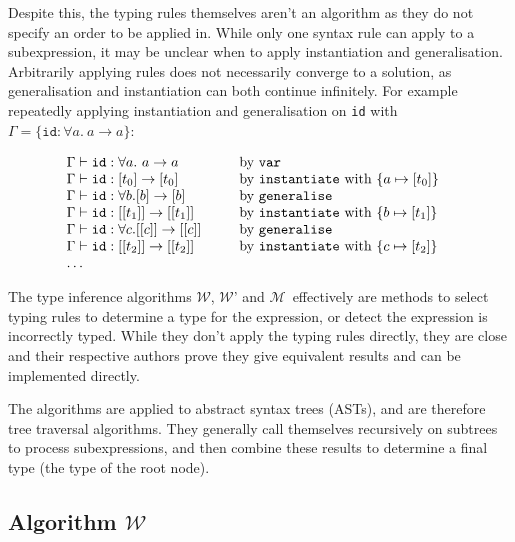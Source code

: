\documentclass[a4paper,fleqn,oneside,12pt]{report}
\newcommand{\W}{$\mathcal{W}$}
\newcommand{\M}{$\mathcal{M}$}
\begin{document}
Despite this, the typing rules themselves aren't an algorithm as they do not specify an order to be applied in. While only one syntax rule can apply to a subexpression, it may be unclear when to apply instantiation and generalisation. Arbitrarily applying rules does not necessarily converge to a solution, as generalisation and instantiation can both continue infinitely. For example repeatedly applying instantiation and generalisation on \texttt{id} with $\Gamma = \{ \mathtt{id} : \forall a.\ a \rightarrow a \}$:

$$
\begin{array}{lclc}
  \Gamma \vdash \mathtt{id} : \forall a.\ a \rightarrow a & \hspace{0.25cm} & \textrm{by}\ \mathtt{var} & \\
  \Gamma \vdash \mathtt{id} : [t_0] \rightarrow [t_0] & & \textrm{by}\ \mathtt{instantiate}\ \textrm{with}\ \{ a \mapsto [t_0] \}& \\
  \Gamma \vdash \mathtt{id} : \forall b. [b] \rightarrow [b] & & \textrm{by}\ \mathtt{generalise} & \\
  \Gamma \vdash \mathtt{id} : [[t_1]] \rightarrow [[t_1]] & & \textrm{by}\ \mathtt{instantiate}\ \textrm{with}\ \{ b \mapsto [t_1] \} & \\
  \Gamma \vdash \mathtt{id} : \forall c. [[c]] \rightarrow [[c]] & & \textrm{by}\ \mathtt{generalise} & \\
  \Gamma \vdash \mathtt{id} : [[t_2]] \rightarrow [[t_2]] & & \textrm{by}\ \mathtt{instantiate}\ \textrm{with}\ \{ c \mapsto [t_2] \} & \\
  \dots & & & \\
\end{array}
$$

The type inference algorithms \W, \W’ and \M\ effectively are methods to select typing rules to determine a type for the expression, or detect the expression is incorrectly typed. While they don't apply the typing rules directly, they are close and their respective authors prove they give equivalent results and can be implemented directly.

The algorithms are applied to abstract syntax trees (ASTs), and are therefore tree traversal algorithms. They generally call themselves recursively on subtrees to process subexpressions, and then combine these results to determine a final type (the type of the root node).

\subsection{Algorithm \texorpdfstring{\W}{W}}
\end{document}
